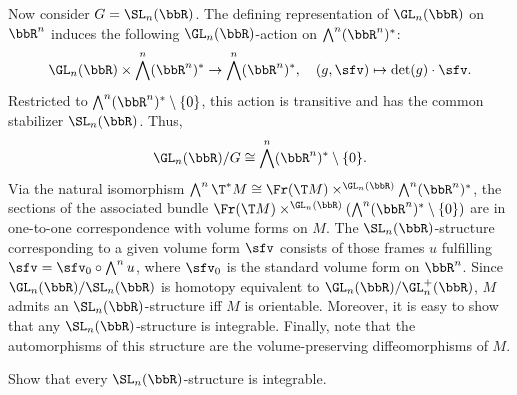 \begin{example}
    Now consider $G=\SL_n(\bbR)$. The defining representation of $\GL_n(\bbR)$ on $\bbR^n$ induces the following $\GL_n(\bbR)$-action on $\bigwedge^n(\bbR^n)^\ast$: 
    \[\GL_n(\bbR)\times \bigwedge^n(\bbR^n)^\ast\to  \bigwedge^n(\bbR^n)^\ast,\quad (g,\sfv)\mapsto \det(g)\cdot\sfv.\]
    Restricted to $\bigwedge^n(\bbR^n)^\ast\setminus\{0\}$, this action is transitive and has the common stabilizer $\SL_n(\bbR)$. Thus, 
    \[\GL_n(\bbR)\slash G\cong \bigwedge^n(\bbR^n)^\ast\setminus\{0\}.\]
    Via the natural isomorphism $\bigwedge^n \T^\ast M\cong \Fr(\T M)\times^{\GL_n(\bbR)}\bigwedge^n(\bbR^n)^\ast$, the sections of the associated bundle $\Fr(\T M)\times^{\GL_n(\bbR)} \left(\bigwedge^n(\bbR^n)^\ast\setminus\{0\}\right)$ are in one-to-one correspondence with volume forms on $M$. The $\SL_n(\bbR)$-structure corresponding to a given volume form $\sfv$ consists of those frames $u$ fulfilling $\sfv=\sfv_0\circ \bigwedge^n u$, where $\sfv_0$ is the standard volume form on $\bbR^n$. Since $\GL_n(\bbR)\slash\SL_n(\bbR)$ is homotopy equivalent to $\GL_n(\bbR)\slash \GL_n^+(\bbR)$, $M$ admits an $\SL_n(\bbR)$-structure iff $M$ is orientable. Moreover, it is easy to show that any $\SL_n(\bbR)$-structure is integrable. Finally, note that the automorphisms of this structure are the volume-preserving diffeomorphisms of $M$.
\end{example}
\begin{xca}
    Show that every $\SL_n(\bbR)$-structure is integrable.
\end{xca}

